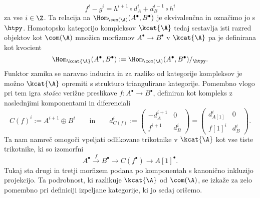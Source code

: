 \[
    f^i - g^i = h^{i+1} \circ d^i_A + d^{i-1}_B \circ h^i
\] 
za vse $i \in \Z$. Ta relacija na $\Hom_{\com(\A)}(A^\bullet, B^\bullet)$ je ekvivalenčna in označimo jo s $\htpy$. Homotopsko kategorijo kompleksov $\kcat{\A}$ tedaj sestavlja isti razred objektov kot $\com(\A)$ množica morfizmov $A^\bullet \to B^\bullet$ v $\kcat{\A}$ pa je definirana kot kvocient
\[
    \Hom_{\kcat{\A}}(A^\bullet, B^\bullet) := \Hom_{\com(\A)}(A^\bullet, B^\bullet)/_\htpy.
\]
Funktor zamika se naravno inducira in za razliko od kategorije kompleksov je možno $\kcat{\A}$ opremiti s strukturo triangulirane kategorije. Pomembno vlogo pri tem igra \emph{stožec} verižne preslikave $f \colon A^\bullet \to B^\bullet$, definiran kot kompleks z naslednjimi komponentami in diferenciali
\[
    C(f)^i := A^{i+1} \oplus B^i \qquad \text{in} \qquad d^i_{C(f)} := \begin{pmatrix}
            -d^{i+1}_A & 0 \\ f^{i+1} & d^i_B
        \end{pmatrix} = \begin{pmatrix}
            d^i_{A[1]} & 0 \\ f[1]^i & d^i_B
        \end{pmatrix}.
\]
Ta nam namreč omogoči vpeljati odlikovane trikotnike v $\kcat{\A}$ kot vse tiste trikotnike, ki so izomorfni
\[
    A^\bullet \xrightarrow{ \ f \ } B^\bullet \longrightarrow C(f^\bullet) \longrightarrow A[1]^\bullet.
\]
Tukaj sta drugi in tretji morfizem podana po komponentah s kanonično inkluzijo \oz projekcijo. 
Ta podrobnost, ki razlikuje $\kcat{\A}$ od $\com(\A)$, se izkaže za zelo pomembno pri definiciji izpeljane kategorije, ki jo sedaj orišemo.  

